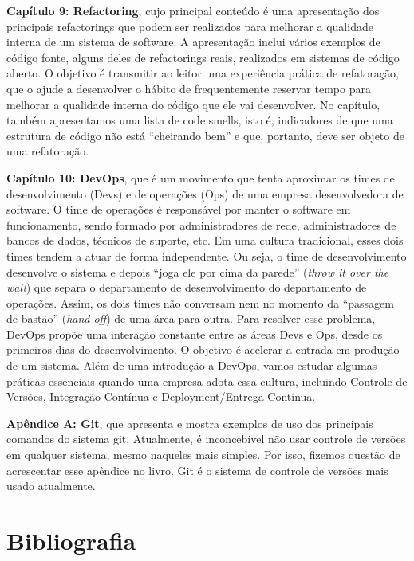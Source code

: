 \documentclass[
  11pt,
  twoside]{book}
\begin{document}
\textbf{Capítulo 9: Refactoring}, cujo principal conteúdo é uma
apresentação dos principais refactorings que podem ser realizados para
melhorar a qualidade interna de um sistema de software. A apresentação
inclui vários exemplos de código fonte, alguns deles de refactorings
reais, realizados em sistemas de código aberto. O objetivo é transmitir
ao leitor uma experiência prática de refatoração, que o ajude a
desenvolver o hábito de frequentemente reservar tempo para melhorar a
qualidade interna do código que ele vai desenvolver. No capítulo, também
apresentamos uma lista de code smells, isto é, indicadores de que uma
estrutura de código não está ``cheirando bem'' e que, portanto, deve ser
objeto de uma refatoração.

\textbf{Capítulo 10: DevOps}, que é um movimento que tenta aproximar os
times de desenvolvimento (Devs) e de operações (Ops) de uma empresa
desenvolvedora de software. O time de operações é responsável por manter
o software em funcionamento, sendo formado por administradores de rede,
administradores de bancos de dados, técnicos de suporte, etc. Em uma
cultura tradicional, esses dois times tendem a atuar de forma
independente. Ou seja, o time de desenvolvimento desenvolve o sistema e
depois ``joga ele por cima da parede'' (\emph{throw it over the wall})
que separa o departamento de desenvolvimento do departamento de
operações. Assim, os dois times não conversam nem no momento da
``passagem de bastão'' (\emph{hand-off}) de uma área para outra. Para
resolver esse problema, DevOps propõe uma interação constante entre as
áreas Devs e Ops, desde os primeiros dias do desenvolvimento. O objetivo
é acelerar a entrada em produção de um sistema. Além de uma introdução a
DevOps, vamos estudar algumas práticas essenciais quando uma empresa
adota essa cultura, incluindo Controle de Versões, Integração Contínua e
Deployment/Entrega Contínua.

\textbf{Apêndice A: Git}, que apresenta e mostra exemplos de uso dos
principais comandos do sistema git. Atualmente, é inconcebível não usar
controle de versões em qualquer sistema, mesmo naqueles mais simples.
Por isso, fizemos questão de acrescentar esse apêndice no livro. Git é o
sistema de controle de versões mais usado atualmente.

\hypertarget{bibliografia}{%
\section*{Bibliografia}\label{bibliografia}}
\end{document}
